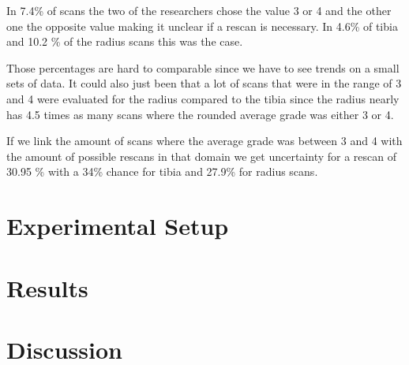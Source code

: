 \documentclass[
a4paper, 
12pt,
grayscalebody, %
abstract=on,
twoside, BCOR10mm, 12pt, DIV13,headinclude, footexclude, final, abstracton, openright
]{ibireprt}
\numberwithin{equation}{chapter}
\numberwithin{table}{chapter}
\numberwithin{figure}{chapter}
\numberwithin{algorithm}{chapter}
\numberwithin{example}{chapter}
\numberwithin{example}{chapter}
\begin{document}
In 7.4\% of scans the two of the researchers chose the value 3 or 4 and the other one the opposite value making it unclear if a rescan is necessary. In 4.6\% of tibia and 10.2 \% of the radius scans this was the case. 

Those percentages are hard to comparable since we have to see trends on a small sets of data. It could also just been that a lot of scans that were in the range of 3 and 4 were evaluated for the radius compared to the tibia since the radius nearly has 4.5 times as many scans where the rounded average grade was either 3 or 4.


If we link the amount of scans where the average grade was between 3 and 4 with the amount of possible rescans in that domain we get uncertainty for a rescan of 30.95 \% with a 34\% chance for tibia and 27.9\% for radius scans. 

\chapter{Experimental Setup}



\chapter{Results}

\chapter{Discussion}


\end{document}
